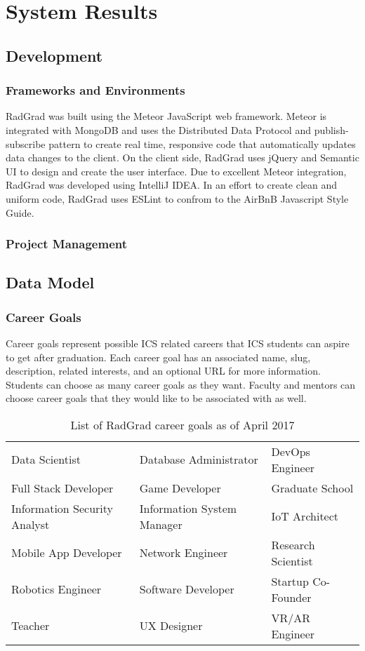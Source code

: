 \chapter{System Results}
\label{system-results}

\section{Development}
\subsection{Frameworks and Environments}
RadGrad was built using the Meteor JavaScript web framework. Meteor is integrated with MongoDB and uses the Distributed Data Protocol and publish-subscribe pattern to create real time, responsive code that automatically updates data changes to the client. On the client side, RadGrad uses jQuery and Semantic UI to design and create the user interface. Due to excellent Meteor integration, RadGrad was developed using IntelliJ IDEA. In an effort to create clean and uniform code, RadGrad uses ESLint to confrom to the AirBnB Javascript Style Guide. 

\subsection{Project Management}


\section{Data Model}
\subsection{Career Goals}
Career goals represent possible ICS related careers that ICS students can aspire to get after graduation. Each career goal has an associated name, slug, description, related interests, and an optional URL for more information. Students can choose as many career goals as they want. Faculty and mentors can choose career goals that they would like to be associated with as well.  

\begin{table}[h!]
\centering
\begin{tabular}{ l l l } 
 Data Scientist & Database Administrator & DevOps Engineer \\ 
 Full Stack Developer & Game Developer & Graduate School \\ 
 Information Security Analyst & Information System Manager & IoT Architect \\ 
 Mobile App Developer & Network Engineer & Research Scientist \\
 Robotics Engineer & Software Developer & Startup Co-Founder \\
 Teacher & UX Designer & VR/AR Engineer 
\end{tabular}
\caption{List of RadGrad career goals as of April 2017}
\label{table:1}
\end{table}

